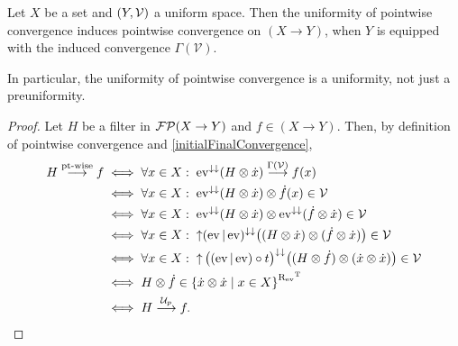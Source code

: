 \begin{lemma}
Let $X$ be a set and $\left( Y, \mathcal{V} \right)$ a uniform space. Then the uniformity of pointwise convergence induces pointwise convergence on $(X\to Y)$, when $Y$ is equipped with the induced convergence $\Gamma(\mathcal{V})$.
\end{lemma}
In particular, the uniformity of pointwise convergence is a uniformity, not just a preuniformity.
\begin{proof}
Let $H$ be a filter in $\operatorname{\mathcal{FP}}(X\to Y)$ and $f\in (X\to Y)$. Then, by definition of pointwise convergence and \ref{initialFinalConvergence},
\begin{align*}
H\overset{\text{pt-wise}}{\longrightarrow} f &\iff \forall x\in X: \; \operatorname{ev}^{\downarrow\downarrow}(H\otimes\dot{x}) \overset{\Gamma(\mathcal{V})}{\longrightarrow} f(x) \\
&\iff \forall x\in X: \; \operatorname{ev}^{\downarrow\downarrow}(H\otimes\dot{x}) \otimes \dot{f}(x) \in\mathcal{V} \\
&\iff \forall x\in X: \; \operatorname{ev}^{\downarrow\downarrow}(H\otimes\dot{x}) \otimes \operatorname{ev}^{\downarrow\downarrow}(\dot{f}\otimes \dot{x}) \in\mathcal{V} \\
&\iff \forall x\in X: \; \operatorname{\uparrow}(\operatorname{ev}|\operatorname{ev})^{\downarrow\downarrow}\big((H\otimes \dot{x}) \otimes (\dot{f}\otimes \dot{x})\big) \in\mathcal{V} \\
&\iff \forall x\in X: \; \operatorname{\uparrow}\big((\operatorname{ev}|\operatorname{ev})\circ t\big)^{\downarrow\downarrow}\big((H\otimes \dot{f}) \otimes (\dot{x}\otimes \dot{x})\big) \in\mathcal{V} \\
&\iff H\otimes \dot{f} \in \left\{ \dot{x}\otimes\dot{x} \;\middle|\; x\in X \right\}^{\mathrel{\mathrm{R}_{\operatorname{ev}}}^{\mathrm{T}}} \\
&\iff H \overset{\mathcal{U}_p}{\longrightarrow} f.
\end{align*}
\end{proof}

